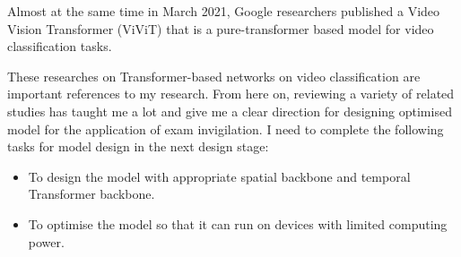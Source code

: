 Almost at the same time in March 2021, Google researchers \citet{arnab2021vivit} published a Video Vision Transformer (ViViT) that is a pure-transformer based model for video classification tasks.


These researches on Transformer-based networks on video classification are important references to my research.
From here on, reviewing a variety of related studies has taught me a lot and give me a clear direction for designing optimised model for the application of exam invigilation.
I need to complete the following tasks for model design in the next design stage:

\begin{itemize}
    \item To design the model with appropriate spatial backbone and temporal Transformer backbone.
    \item To optimise the model so that it can run on devices with limited computing power.
\end{itemize}
